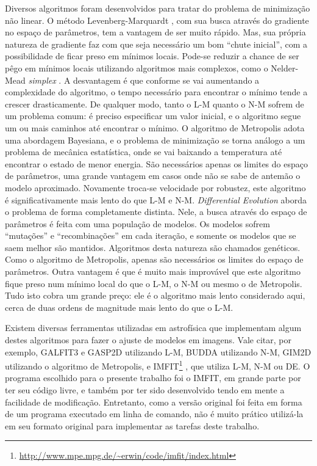 Diversos algoritmos foram desenvolvidos para tratar do problema de minimização
não linear. O método Levenberg-Marquardt \citep[daqui em diante
L-M]{Levenberg1944, Marquardt1963}, com sua busca através do gradiente no espaço
de parâmetros, tem a vantagem de ser muito rápido. Mas, sua própria natureza de
gradiente faz com que seja necessário um bom ``chute inicial'', com a
possibilidade de ficar preso em mínimos locais. Pode-se reduzir a chance de ser
pêgo em mínimos locais utilizando algoritmos mais complexos, como o Nelder-Mead
{\em simplex} \citep[daqui em diante N-M]{Nelder1965}. A desvantagem é que
conforme se vai aumentando a complexidade do algoritmo, o tempo necessário para
encontrar o mínimo tende a crescer drasticamente. De qualquer modo, tanto o L-M
quanto o N-M sofrem de um problema comum: é preciso especificar um valor
inicial, e o algoritmo segue um ou mais caminhos até encontrar o mínimo. O
algoritmo de Metropolis \citep{Metropolis1953, Saha1994} adota uma abordagem
Bayesiana, e o problema de minimização se torna análogo a um problema de
mecânica estatística, onde se vai baixando a temperatura até encontrar o
estado de menor energia. São necessários apenas os limites do espaço de
parâmetros, uma grande vantagem em casos onde não se sabe de antemão o modelo
aproximado. Novamente troca-se velocidade por robustez, este algoritmo é
significativamente mais lento do que L-M e N-M. {\em Differential Evolution}
\citep[daqui em diante DE]{Storn1997} aborda o problema de forma completamente
distinta. Nele, a busca através do espaço de parâmetros é feita com uma
população de modelos. Os modelos sofrem ``mutações'' e ``recombinações'' em cada
iteração, e somente os modelos que se saem melhor são mantidos. Algoritmos desta
natureza são chamados genéticos. Como o algoritmo de Metropolis, apenas são
necessários os limites do espaço de parâmetros. Outra vantagem é que é muito
mais improvável que este algoritmo fique preso num mínimo local do que o L-M, o
N-M ou mesmo o de Metropolis. Tudo isto cobra um grande preço: ele é o algoritmo
mais lento considerado aqui, cerca de duas ordens de magnitude mais lento do que
o L-M.

Existem diversas ferramentas utilizadas em astrofísica que implementam algum
destes algoritmos para fazer o ajuste de modelos em imagens. Vale citar, por
exemplo, GALFIT3 \citep{Peng2010} e GASP2D \citep{MendezAbreu2008} utilizando
L-M, BUDDA \citep{DeSouza2004} utilizando N-M, GIM2D \citep{Simard2002}
utilizando o algoritmo de Metropolis, e
IMFIT\footnote{\url{http://www.mpe.mpg.de/~erwin/code/imfit/index.html}}
\citet{Erwin2015}, que utiliza L-M, N-M ou DE. O programa escolhido para o
presente trabalho foi o IMFIT, em grande parte por ter seu código livre, e
também por ter sido desenvolvido tendo em mente a facilidade de modificação.
Entretanto, como a versão original foi feita em forma de um programa executado
em linha de comando, não é muito prático utilizá-la em seu formato original para
implementar as tarefas deste trabalho.

